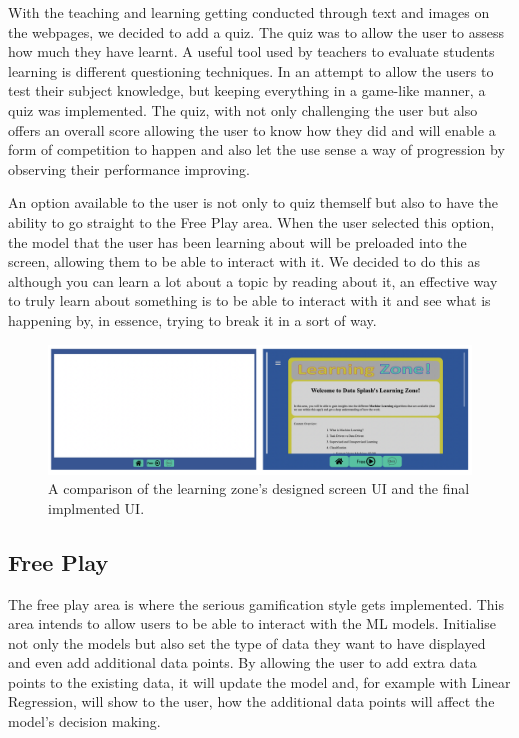 	With the teaching and learning getting conducted through text and images on the webpages, we decided to add a quiz. The quiz was to allow the user to assess how much they have learnt. A useful tool used by teachers to evaluate students learning is different questioning techniques. In an attempt to allow the users to test their subject knowledge, but keeping everything in a game-like manner, a quiz was implemented. The quiz, with not only challenging the user but also offers an overall score allowing the user to know how they did and will enable a form of competition to happen and also let the use sense a way of progression by observing their performance improving.
	
	An option available to the user is not only to quiz themself but also to have the ability to go straight to the Free Play area. When the user selected this option, the model that the user has been learning about will be preloaded into the screen, allowing them to be able to interact with it. We decided to do this as although you can learn a lot about a topic by reading about it, an effective way to truly learn about something is to be able to interact with it and see what is happening by, in essence, trying to break it in a sort of way.
	
	\begin{figure}[t]
		\includegraphics[width=15cm]{graphics/learning_zone.png}
		\caption{A comparison of the learning zone's designed screen UI and the final implmented UI.}
		\label{fig:ui_lz}
	\end{figure}
	
	\subsection{Free Play}
	
	The free play area is where the serious gamification style gets implemented. This area intends to allow users to be able to interact with the ML models. Initialise not only the models but also set the type of data they want to have displayed and even add additional data points. By allowing the user to add extra data points to the existing data, it will update the model and, for example with Linear Regression, will show to the user, how the additional data points will affect the model's decision making.
	
